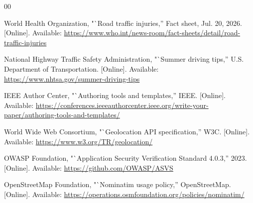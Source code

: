\documentclass[conference]{IEEEtran}
\begin{document}
\begin{thebibliography}{00}

World Health Organization, "`Road traffic injuries,'' Fact sheet, Jul. 20, 2026. [Online]. Available: \url{https://www.who.int/news-room/fact-sheets/detail/road-traffic-injuries}

National Highway Traffic Safety Administration, "`Summer driving tips,'' U.S. Department of Transportation. [Online]. Available: \url{https://www.nhtsa.gov/summer-driving-tips}

IEEE Author Center, "`Authoring tools and templates,'' IEEE. [Online]. Available: \url{https://conferences.ieeeauthorcenter.ieee.org/write-your-paper/authoring-tools-and-templates/}

World Wide Web Consortium, "`Geolocation API specification,'' W3C. [Online]. Available: \url{https://www.w3.org/TR/geolocation/}

OWASP Foundation, "`Application Security Verification Standard 4.0.3,'' 2023. [Online]. Available: \url{https://github.com/OWASP/ASVS}

OpenStreetMap Foundation, "`Nominatim usage policy,'' OpenStreetMap. [Online]. Available: \url{https://operations.osmfoundation.org/policies/nominatim/}

\end{thebibliography}
\end{document}
